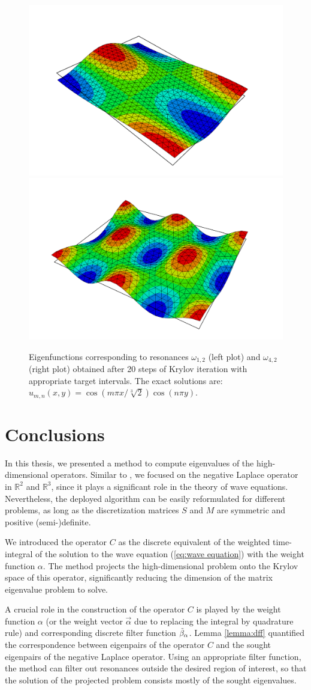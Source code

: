 \documentclass[a4paper,11pt,bibliography=totoc,listof=totoc,headinclude=true,cleardoublepage=empty,oneside]{scrbook}
\newcommand{\R}{\mathbb{R}}
\newcommand{\dff}{\Tilde{\beta}_\alpha}
\renewcommand{\eqref}[1]{(\ref{#1})}
\begin{document}
\begin{figure}[h]
    \centering
    \includegraphics[width=0.49\linewidth]{latex//images//simulation/sim_4.png}
    \includegraphics[width=0.49\linewidth]{latex//images//simulation/sim_2.png}
    \caption{Eigenfunctions corresponding to resonances $\omega_{1,2}$ (left plot) and $\omega_{4,2}$ (right plot) obtained after 20 steps of Krylov iteration with appropriate target intervals. The exact solutions are: $u_{m,n}(x,y) = \cos\left(m\pi x /\sqrt[3]{2}\right)\cos(n\pi y)$.}
    \label{fig:waves}
\end{figure}


\chapter{Conclusions}
In this thesis, we presented a method to compute eigenvalues of the high-dimensional operators. Similar to \cite{nannen}, we focused on the negative Laplace operator in $\R^2$ and $\R^3$, since it plays a significant role in the theory of wave equations. Nevertheless, the deployed algorithm can be easily reformulated for different problems, as long as the discretization matrices $S$ and $M$ are symmetric and positive (semi-)definite. 

We introduced the operator $C$ as the discrete equivalent of the weighted time-integral of the solution to the wave equation \eqref{eq:wave equation} with the weight function $\alpha$. The method projects the high-dimensional problem onto the Krylov space of this operator, significantly reducing the dimension of the matrix eigenvalue problem to solve. 

A crucial role in the construction of the operator $C$ is played by the weight function $\alpha$ (or the weight vector $\Vec{\alpha}$ due to replacing the integral by quadrature rule) and corresponding discrete filter function $\dff$. Lemma \ref{lemma:dff} quantified the correspondence between eigenpairs of the operator $C$ and the sought eigenpairs of the negative Laplace operator. Using an appropriate filter function, the method can filter out resonances outside the desired region of interest, so that the solution of the projected problem consists mostly of the sought eigenvalues. 
\end{document}
